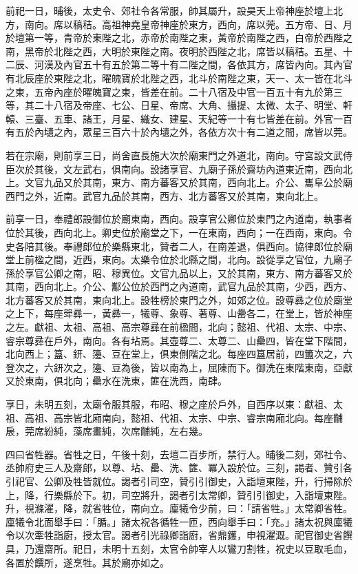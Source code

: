 \begin{pinyinscope}
 前祀一日，晡後，太史令、郊社令各常服，帥其屬升，設昊天上帝神座於壇上北方，南向。席以稿秸。高祖神堯皇帝神座於東方，西向，席以莞。五方帝、日、月於壇第一等，青帝於東陛之北，赤帝於南陛之東，黃帝於南陛之西，白帝於西陛之南，黑帝於北陛之西，大明於東陛之南。夜明於西陛之北，席皆以稿秸。五星、十二辰、河漢及內官五十有五於第二等十有二陛之間，各依其方，席皆內向。其內官有北辰座於東陛之北，曜魄寶於北陛之西，北斗於南陛之東，天一、太一皆在北斗之東，五帝內座於曜魄寶之東，皆差在前。二十八宿及中官一百五十有九於第三等，其二十八宿及帝座、七公、日星、帝席、大角、攝提、太微、太子、明堂、軒轅、三臺、五車、諸王，月星、織女、建星、天紀等一十有七皆差在前。外官一百有五於內壝之內，眾星三百六十於內壝之外，各依方次十有二道之間，席皆以莞。



 若在宗廟，則前享三日，尚舍直長施大次於廟東門之外道北，南向。守宮設文武侍臣次於其後，文左武右，俱南向。設諸享官、九廟子孫於齋坊內道東近南，西向北上。文官九品又於其南，東方、南方蕃客又於其南，西向北上。介公、巂阜公於廟西門之外，近南。武官九品於其南，西方、北方蕃客又於其南，東向北上。



 前享一日，奉禮郎設御位於廟東南，西向。設享官公卿位於東門之內道南，執事者位於其後，西向北上。卿史位於廟堂之下，一在東南，西向；一在西南，東向。令史各陪其後。奉禮郎位於樂縣東北，贊者二人，在南差退，俱西向。協律郎位於廟堂上前楹之間，近西，東向。太樂令位於北縣之間，北向。設從享之官位，九廟子孫於享官公卿之南，昭、穆異位。文官九品以上，又於其南，東方、南方蕃客又於其南，西向北上。介公、酅公位於西門之內道南，武官九品於其南，少西，西方、北方蕃客又於其南，東向北上。設牲榜於東門之外，如郊之位。設尊彞之位於廟堂之上下，每座斝彞一，黃彞一，犧尊、象尊、著尊、山罍各二，在堂上，皆於神座之左。獻祖、太祖、高祖、高宗尊彞在前楹間，北向；懿祖、代祖、太宗、中宗、睿宗尊彞在戶外，南向。各有坫焉。其壺尊二、太尊二、山罍四，皆在堂下階間，北向西上；簋、鈃、籩、豆在堂上，俱東側階之北。每座四簋居前，四簠次之，六登次之，六鈃次之，籩、豆為後，皆以南為上，屈陳而下。御洗在東階東南，亞獻又於東南，俱北向；罍水在洗東，篚在洗西，南肆。



 享日，未明五刻，太廟令服其服，布昭、穆之座於戶外，自西序以東：獻祖、太祖、高祖、高宗皆北廂南向，懿祖、代祖、太宗、中宗、睿宗南廂北向。每座黼扆，莞席紛純，藻席畫純，次席黼純，左右幾。



 四曰省牲器。省牲之日，午後十刻，去壇二百步所，禁行人。晡後二刻，郊社令、丞帥府史三人及齋郎，以尊、坫、罍、洗、篚、冪入設於位。三刻，謁者、贊引各引祀官、公卿及牲皆就位。謁者引司空，贊引引御史，入詣壇東陛，升，行掃除於上，降，行樂縣於下。初，司空將升，謁者引太常卿，贊引引御史，入詣壇東陛。升，視滌濯，降，就省牲位，南向立。廩犧令少前，曰：「請省牲。」太常卿省牲。廩犧令北面舉手曰：「腯。」諸太祝各循牲一匝，西向舉手曰：「充。」諸太祝與廩犧令以次牽牲詣廚，授太官。謁者引光祿卿詣廚，省鼎鑊，申視濯溉。祀官御史省饌具，乃還齋所。祀日，未明十五刻，太官令帥宰人以鸞刀割牲，祝史以豆取毛血，各置於饌所，遂烹牲。其於廟亦如之。




\end{pinyinscope}
